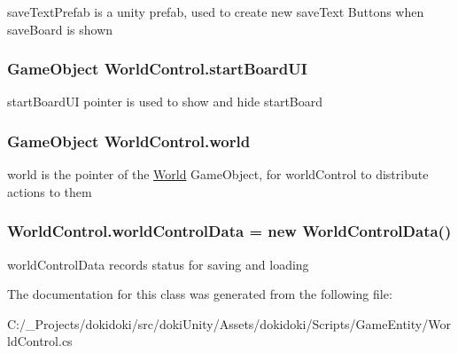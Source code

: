 save\+Text\+Prefab is a unity prefab, used to create new save\+Text Buttons when save\+Board is shown 

\subsubsection[{\texorpdfstring{start\+Board\+UI}{startBoardUI}}]{\setlength{\rightskip}{0pt plus 5cm}Game\+Object World\+Control.\+start\+Board\+UI}\hypertarget{class_world_control_a4430b205ccaccd23d2812722a9b681b8}{}\label{class_world_control_a4430b205ccaccd23d2812722a9b681b8}


start\+Board\+UI pointer is used to show and hide start\+Board 

\subsubsection[{\texorpdfstring{world}{world}}]{\setlength{\rightskip}{0pt plus 5cm}Game\+Object World\+Control.\+world}\hypertarget{class_world_control_a9e1cb13fdda96c502e83d41f52bda761}{}\label{class_world_control_a9e1cb13fdda96c502e83d41f52bda761}


world is the pointer of the \hyperlink{class_world}{World} Game\+Object, for world\+Control to distribute actions to them 

\subsubsection[{\texorpdfstring{world\+Control\+Data}{worldControlData}}]{ World\+Control.\+world\+Control\+Data = new {\bf World\+Control\+Data}()}\hypertarget{class_world_control_a61aa6f540da8869b1b1dc8af6adead26}{}\label{class_world_control_a61aa6f540da8869b1b1dc8af6adead26}


world\+Control\+Data records status for saving and loading 



The documentation for this class was generated from the following file\+:\begin{DoxyCompactItemize}
\item 
C\+:/\+\_\+\+Projects/dokidoki/src/doki\+Unity/\+Assets/dokidoki/\+Scripts/\+Game\+Entity/World\+Control.\+cs\end{DoxyCompactItemize}
